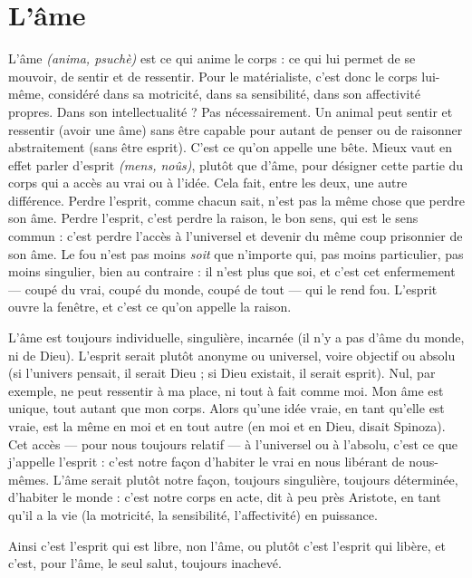 
\section{L'âme}
L'âme {\it (anima, psuchè)} est ce qui anime le corps : ce qui lui permet de se
mouvoir, de sentir et de ressentir. Pour le matérialiste, c’est donc le
corps lui-même, considéré dans sa motricité, dans sa sensibilité, dans son affectivité
propres. Dans son intellectualité ? Pas nécessairement. Un animal peut
sentir et ressentir (avoir une âme) sans être capable pour autant de penser ou de
raisonner abstraitement (sans être esprit). C’est ce qu’on appelle une bête.
Mieux vaut en effet parler d’esprit {\it (mens, noûs)}, plutôt que d’âme, pour désigner
cette partie du corps qui a accès au vrai ou à l’idée. Cela fait, entre les
deux, une autre différence. Perdre l'esprit, comme chacun sait, n’est pas la
même chose que perdre son âme. Perdre l'esprit, c’est perdre la raison, le bon
sens, qui est le sens commun : c’est perdre l’accès à l’universel et devenir du
même coup prisonnier de son âme. Le fou n’est pas moins {\it soit} que n'importe
qui, pas moins particulier, pas moins singulier, bien au contraire : il n’est plus
que soi, et c’est cet enfermement — coupé du vrai, coupé du monde, coupé de
tout — qui le rend fou. L'esprit ouvre la fenêtre, et c’est ce qu’on appelle la
raison.

L'âme est toujours individuelle, singulière, incarnée (il n’y a pas d’âme du
monde, ni de Dieu). L’esprit serait plutôt anonyme ou universel, voire objectif
ou absolu (si l’univers pensait, il serait Dieu ; si Dieu existait, il serait esprit).
Nul, par exemple, ne peut ressentir à ma place, ni tout à fait comme moi. Mon
âme est unique, tout autant que mon corps. Alors qu’une idée vraie, en tant
qu’elle est vraie, est la même en moi et en tout autre (en moi et en Dieu, disait
Spinoza). Cet accès — pour nous toujours relatif — à l’universel ou à l'absolu,
c'est ce que j'appelle l'esprit : c’est notre façon d’habiter le vrai en nous libérant
de nous-mêmes. L’âme serait plutôt notre façon, toujours singulière, toujours
déterminée, d’habiter le monde : c’est notre corps en acte, dit à peu près Aristote,
en tant qu'il a la vie (la motricité, la sensibilité, l’affectivité) en puissance.

Ainsi c’est l'esprit qui est libre, non l’âme, ou plutôt c’est l'esprit qui libère,
et c’est, pour l’âme, le seul salut, toujours inachevé.

